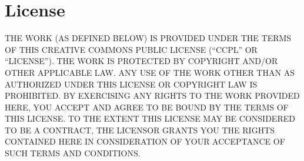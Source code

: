 
\makeatletter
\def\theenumi{\@alph\c@enumi}%
\makeatother

\section*{License}
THE WORK (AS DEFINED BELOW) IS PROVIDED UNDER THE TERMS OF THIS CREATIVE COMMONS PUBLIC LICENSE
(``CCPL'' OR ``LICENSE'').
THE WORK IS PROTECTED BY COPYRIGHT AND/OR OTHER APPLICABLE LAW.
ANY USE OF THE WORK OTHER THAN AS AUTHORIZED UNDER THIS LICENSE OR COPYRIGHT LAW IS PROHIBITED.
BY EXERCISING ANY RIGHTS TO THE WORK PROVIDED HERE,
YOU ACCEPT AND AGREE TO BE BOUND BY THE TERMS OF THIS LICENSE.
TO THE EXTENT THIS LICENSE MAY BE CONSIDERED TO BE A CONTRACT,
THE LICENSOR GRANTS YOU THE RIGHTS CONTAINED HERE IN CONSIDERATION OF
YOUR ACCEPTANCE OF SUCH TERMS AND CONDITIONS.


